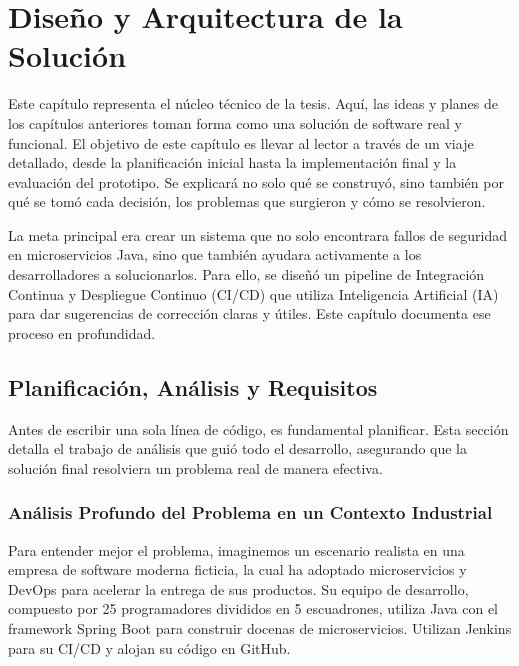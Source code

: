 
\chapter{Diseño y Arquitectura de la Solución}
\label{chap:desarrollo}

Este capítulo representa el núcleo técnico de la tesis. Aquí, las ideas y planes de los capítulos anteriores toman forma como una solución de software real y funcional. El objetivo de este capítulo es llevar al lector a través de un viaje detallado, desde la planificación inicial hasta la implementación final y la evaluación del prototipo. Se explicará no solo qué se construyó, sino también por qué se tomó cada decisión, los problemas que surgieron y cómo se resolvieron.

La meta principal era crear un sistema que no solo encontrara fallos de seguridad en microservicios Java, sino que también ayudara activamente a los desarrolladores a solucionarlos. Para ello, se diseñó un pipeline de Integración Continua y Despliegue Continuo (CI/CD) que utiliza Inteligencia Artificial (IA) para dar sugerencias de corrección claras y útiles. Este capítulo documenta ese proceso en profundidad.

\section{Planificación, Análisis y Requisitos}
\label{sec:plani_desarrollo}

Antes de escribir una sola línea de código, es fundamental planificar. Esta sección detalla el trabajo de análisis que guió todo el desarrollo, asegurando que la solución final resolviera un problema real de manera efectiva.

\subsection{Análisis Profundo del Problema en un Contexto Industrial}

Para entender mejor el problema, imaginemos un escenario realista en una empresa de software moderna ficticia, la cual ha adoptado microservicios y DevOps para acelerar la entrega de sus productos. Su equipo de desarrollo, compuesto por 25 programadores divididos en 5 escuadrones, utiliza Java con el framework Spring Boot para construir docenas de microservicios. Utilizan Jenkins para su CI/CD y alojan su código en GitHub.

